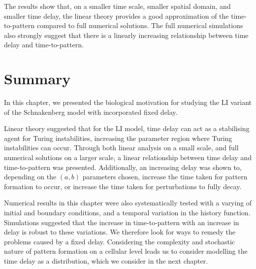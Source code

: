 
The results show that, on a smaller time scale, smaller spatial domain, and smaller time delay, the linear theory provides a good approximation of the time-to-pattern compared to full numerical solutions. The full numerical simulations also strongly suggest that there is a linearly increasing relationship between time delay and time-to-pattern.
\section{Summary}

In this chapter, we presented the biological motivation for studying the LI variant of the Schnakenberg model with incorporated fixed delay.

Linear theory suggested that for the LI model, time delay can act as a stabilising agent for Turing instabilities, increasing the parameter region where Turing instabilities can occur. Through both linear analysis on a small scale, and full numerical solutions on a larger scale, a linear relationship between time delay and time-to-pattern was presented. Additionally, an increasing delay was shown to, depending on the $(a,b)$ parameters chosen, increase the time taken for pattern formation to occur, or increase the time taken for perturbations to fully decay.

Numerical results in this chapter were also systematically tested with a varying of initial and boundary conditions, and a temporal variation in the history function. Simulations suggested that the increase in time-to-pattern with an increase in delay is robust to these variations. We therefore look for ways to remedy the problems caused by a fixed delay. Considering the complexity and stochastic nature of pattern formation on a cellular level leads us to consider modelling the time delay as a distribution, which we consider in the next chapter.
